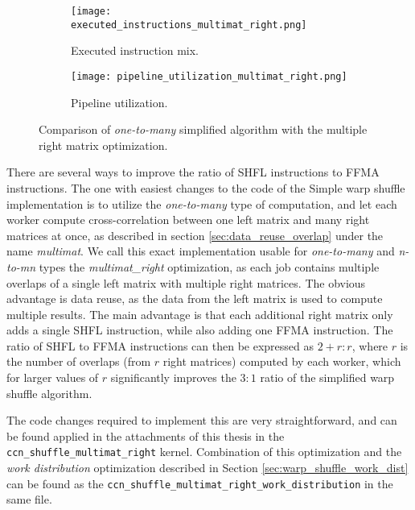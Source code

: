 \begin{figure}[ht]
	\centering	
	\begin{subfigure}{\textwidth}
		\centering
		\texttt{[image: executed\_instructions\_multimat\_right.png]}
		\caption{Executed instruction mix.}
		\label{fig:executed_instructions_multimat_right}
	\end{subfigure}
	\hfill
	\begin{subfigure}{\textwidth}
		\centering
		\texttt{[image: pipeline\_utilization\_multimat\_right.png]}
		\caption{Pipeline utilization.}
		\label{fig:pipeline_utilization_multimat_right}
	\end{subfigure}
	
	\caption{Comparison of \textit{one-to-many} simplified algorithm with the multiple right matrix optimization.}
	\label{fig:multimat_right_profiling}
\end{figure}

There are several ways to improve the ratio of SHFL instructions to FFMA instructions. The one with easiest changes to the code of the Simple warp shuffle implementation is to utilize the \textit{one-to-many} type of computation, and let each worker compute cross-correlation between one left matrix and many right matrices at once, as described in section \ref{sec:data_reuse_overlap} under the name \textit{multimat}. We call this exact implementation usable for \textit{one-to-many} and \textit{n-to-mn} types the \textit{multimat\_right} optimization, as each job contains multiple overlaps of a single left matrix with multiple right matrices. The obvious advantage is data reuse, as the data from the left matrix is used to compute multiple results. The main advantage is that each additional right matrix only adds a single SHFL instruction, while also adding one FFMA instruction. The ratio of SHFL to FFMA instructions can then be expressed as $2 + r : r$, where $r$ is the number of overlaps (from $r$ right matrices) computed by each worker, which for larger values of $r$ significantly improves the $3:1$ ratio of the simplified warp shuffle algorithm.


The code changes required to implement this are very straightforward, and can be found applied in the attachments of this thesis in the \texttt{ccn\_shuffle\_multimat\_right} kernel. Combination of this optimization and the \textit{work distribution} optimization described in Section \ref{sec:warp_shuffle_work_dist} can be found as the \texttt{ccn\_shuffle\_multimat\_right\_work\_distribution} in the same file.

